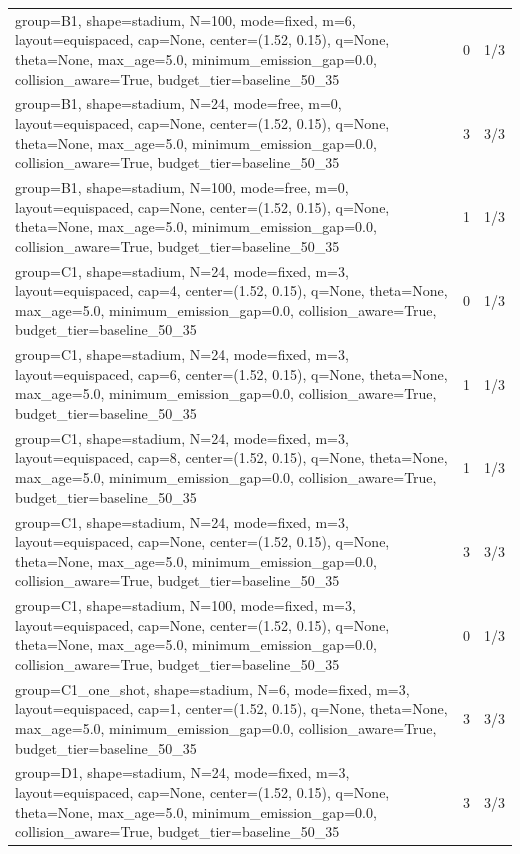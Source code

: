 \begin{tabular}{p{11cm}rr}
group=B1, shape=stadium, N=100, mode=fixed, m=6, layout=equispaced, cap=None, center=(1.52, 0.15), q=None, theta=None, max\_age=5.0, minimum\_emission\_gap=0.0, collision\_aware=True, budget\_tier=baseline\_50\_35 & 0 & 1/3 \\
group=B1, shape=stadium, N=24, mode=free, m=0, layout=equispaced, cap=None, center=(1.52, 0.15), q=None, theta=None, max\_age=5.0, minimum\_emission\_gap=0.0, collision\_aware=True, budget\_tier=baseline\_50\_35 & 3 & 3/3 \\
group=B1, shape=stadium, N=100, mode=free, m=0, layout=equispaced, cap=None, center=(1.52, 0.15), q=None, theta=None, max\_age=5.0, minimum\_emission\_gap=0.0, collision\_aware=True, budget\_tier=baseline\_50\_35 & 1 & 1/3 \\
group=C1, shape=stadium, N=24, mode=fixed, m=3, layout=equispaced, cap=4, center=(1.52, 0.15), q=None, theta=None, max\_age=5.0, minimum\_emission\_gap=0.0, collision\_aware=True, budget\_tier=baseline\_50\_35 & 0 & 1/3 \\
group=C1, shape=stadium, N=24, mode=fixed, m=3, layout=equispaced, cap=6, center=(1.52, 0.15), q=None, theta=None, max\_age=5.0, minimum\_emission\_gap=0.0, collision\_aware=True, budget\_tier=baseline\_50\_35 & 1 & 1/3 \\
group=C1, shape=stadium, N=24, mode=fixed, m=3, layout=equispaced, cap=8, center=(1.52, 0.15), q=None, theta=None, max\_age=5.0, minimum\_emission\_gap=0.0, collision\_aware=True, budget\_tier=baseline\_50\_35 & 1 & 1/3 \\
group=C1, shape=stadium, N=24, mode=fixed, m=3, layout=equispaced, cap=None, center=(1.52, 0.15), q=None, theta=None, max\_age=5.0, minimum\_emission\_gap=0.0, collision\_aware=True, budget\_tier=baseline\_50\_35 & 3 & 3/3 \\
group=C1, shape=stadium, N=100, mode=fixed, m=3, layout=equispaced, cap=None, center=(1.52, 0.15), q=None, theta=None, max\_age=5.0, minimum\_emission\_gap=0.0, collision\_aware=True, budget\_tier=baseline\_50\_35 & 0 & 1/3 \\
group=C1\_one\_shot, shape=stadium, N=6, mode=fixed, m=3, layout=equispaced, cap=1, center=(1.52, 0.15), q=None, theta=None, max\_age=5.0, minimum\_emission\_gap=0.0, collision\_aware=True, budget\_tier=baseline\_50\_35 & 3 & 3/3 \\
group=D1, shape=stadium, N=24, mode=fixed, m=3, layout=equispaced, cap=None, center=(1.52, 0.15), q=None, theta=None, max\_age=5.0, minimum\_emission\_gap=0.0, collision\_aware=True, budget\_tier=baseline\_50\_35 & 3 & 3/3 \\

\end{tabular}
